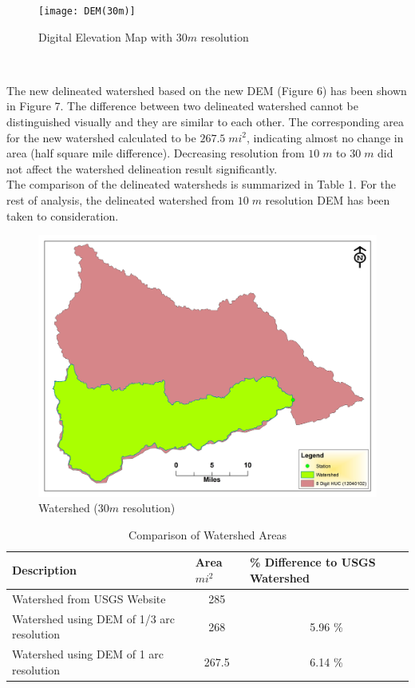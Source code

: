 \documentclass[letterpaper,12pt]{article}
\begin{document}
\begin{enumerate}
	\begin{figure}[H]
		\begin{center}
			\texttt{[image: DEM(30m)]}
		\end{center}
	\caption{Digital Elevation Map with $30m$ resolution}\label{dem30}
	\end{figure}~

	The new delineated watershed based on the new DEM (Figure 6) has been shown in Figure 7. The difference between two delineated watershed cannot be distinguished visually and they are similar to each other. The corresponding area for the new watershed calculated to be $267.5\;mi^2$, indicating almost no change in area (half square mile difference). Decreasing resolution from $10\;m$ to $30\;m$ did not affect the watershed delineation result significantly.\\
	The comparison of the delineated watersheds is summarized in Table 1. 	For the rest of analysis, the delineated watershed from $10 \; m$ resolution DEM has been taken to consideration.
	
	
	
	\begin{figure}[H]
		\begin{center}
			\includegraphics[width=16cm]{watershed(30m)2}
		\end{center}
	\caption{Watershed ($30m$ resolution)}\label{wsh30}
	\end{figure}

	\begin{table}[H]
	\centering
	\caption{Comparison of Watershed Areas}
	\label{my-label}
	\begin{tabular}{|l|c|c|}
		\hline
		Description & \multicolumn{1}{l|}{Area $mi^2$} & \multicolumn{1}{l|}{\% Difference to USGS Watershed} \\ \hline
		Watershed from USGS Website & 285 &  \\ \hline
		Watershed using DEM of 1/3 arc resolution & 268 & 5.96 \% \\ \hline
		Watershed using DEM of 1 arc resolution & 267.5 & 6.14 \% \\ \hline
		\end{tabular}
	\end{table}
	




\end{enumerate}
\end{document}
